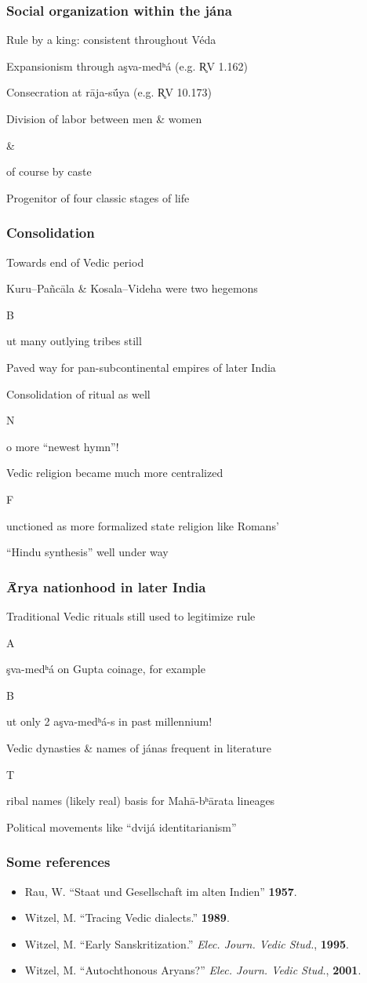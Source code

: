 \documentclass[pdf]{beamer}
\newcommand{\Subitem}[1]{{\setlength\itemindent{12pt} \item[-] #1}}
\begin{document}
\begin{frame} \frametitle{Social organization within the jána}
\begin{itemize}
	\item Rule by a king: consistent throughout Véda
	\item Expansionism through aşva-medʰá (e.g. R̥V 1.162)
	\item Consecration at rāja-sū́ya (e.g. R̥V 10.173)
	\item Division of labor between men \& women
	\Subitem \& of course by caste
	\item Progenitor of four classic stages of life
\end{itemize}
\end{frame}

\begin{frame} \frametitle{Consolidation}
\begin{itemize}
	\item Towards end of Vedic period
	\item Kuru–Pañcāla \& Kosala--Videha were two hegemons
	\Subitem But many outlying tribes still
	\item Paved way for pan-subcontinental empires of later India
	\item Consolidation of ritual as well
	\Subitem No more “newest hymn”!
	\item Vedic religion became much more centralized
	\Subitem Functioned as more formalized state religion like Romans'
	\item “Hindu synthesis” well under way
\end{itemize}
\end{frame}

\begin{frame} \frametitle{Ā́rya nationhood in later India}
\begin{itemize}
	\item Traditional Vedic rituals still used to legitimize rule
	\Subitem Aşva-medʰá on Gupta coinage, for example
	\Subitem But only 2 aşva-medʰá-s in past millennium!
	\item Vedic dynasties \& names of jánas frequent in literature
	\Subitem Tribal names (likely real) basis for Mahā-bʰārata lineages
	\item Political movements like “dvijá identitarianism”
\end{itemize}
\end{frame}

\begin{frame} \frametitle{Some references}
\begin{itemize}
	\item Rau, W. ``Staat und Gesellschaft im alten Indien'' \textbf{1957}.
	\item Witzel, M. ``Tracing Vedic dialects.'' \textbf{1989}.
	\item Witzel, M. ``Early Sanskritization.'' \textit{Elec. Journ. Vedic Stud.}, \textbf{1995}.
	\item Witzel, M. ``Autochthonous Aryans?'' \textit{Elec. Journ. Vedic Stud.}, \textbf{2001}.
\end{itemize}
\end{frame}

\end{document}
